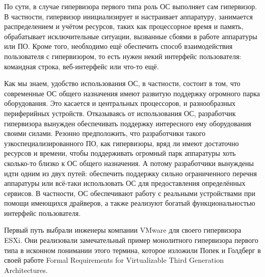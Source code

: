 \documentclass[14pt, a4paper]{article}
\begin{document}
По сути, в случае гипервизора первого типа роль ОС выполняет сам гипервизор. В частности,
гипервизор инициализирует и настраивает аппаратуру, занимается распределением и учётом
ресурсов, таких как процессорное время и память, обрабатывает исключительные ситуации,
вызванные сбоями в работе аппаратуры или ПО. Кроме того, необходимо ещё обеспечить способ
взаимодействия пользователя с гипервизором, то есть нужен некий интерфейс пользователя:
командная строка, веб-интерфейс или что-то ещё.

Как мы знаем, удобство использования ОС, в частности, состоит в том, что современные ОС общего
назначения имеют развитую поддержку огромного парка оборудования. Это касается и центральных
процессоров, и разнообразных периферийных устройств. Отказываясь от использования ОС,
разработчик гипервизора вынужден обеспечивать поддержку интересного ему оборудования своими
силами. Резонно предположить, что разработчики такого узкоспециализированного ПО, как
гипервизоры, вряд ли имеют достаточно ресурсов и времени, чтобы поддерживать огромный парк
аппаратуры хоть сколько-то близко к ОС общего назначения. А потому разработчики вынуждены идти
одним из двух путей: обеспечить поддержку сильно ограниченного перечня аппаратуры или всё-таки
использовать ОС для предоставления определённых сервисов. В частности, ОС обеспечивают работу
с реальными устройствами при помощи имеющихся драйверов, а также реализуют богатый
функциональностью интерфейс пользователя.

Первый путь выбрали инженеры компании VMware для своего гипервизора ESXi. Они реализовали
замечательный пример монолитного гипервизора первого типа в исконном понимании этого термина,
которое изложили Попек и Голдберг в своей работе Formal Requirements for Virtualizable Third
Generation Architectures.

\begin{figure}[h]%
    \centering
    \label{framework} %
\end{figure}
\end{document}
